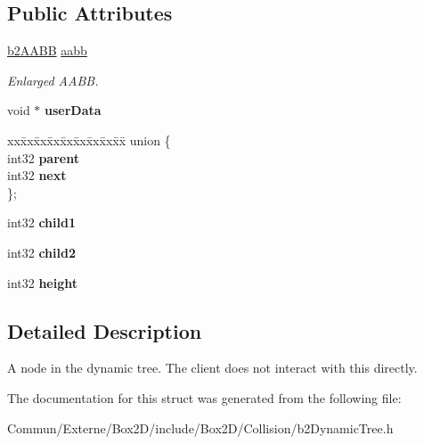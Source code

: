 \subsection*{Public Attributes}
\begin{DoxyCompactItemize}
\item 
\hyperlink{structb2_a_a_b_b}{b2\+A\+A\+BB} \hyperlink{structb2_tree_node_a798f1a594b33c713be45e76e79912239}{aabb}\hypertarget{structb2_tree_node_a798f1a594b33c713be45e76e79912239}{}\label{structb2_tree_node_a798f1a594b33c713be45e76e79912239}

\begin{DoxyCompactList}\small\item\em Enlarged A\+A\+BB. \end{DoxyCompactList}\item 
void $\ast$ {\bfseries user\+Data}\hypertarget{structb2_tree_node_aff77b3eb48326aca1b0762f5c45e56e7}{}\label{structb2_tree_node_aff77b3eb48326aca1b0762f5c45e56e7}

\item 
\begin{tabbing}
xx\=xx\=xx\=xx\=xx\=xx\=xx\=xx\=xx\=\kill
union \{\\
\>int32 {\bfseries parent}\\
\>int32 {\bfseries next}\\
\}; \hypertarget{structb2_tree_node_a9d8975d1e109fb59c7f549f1da7d75c4}{}\label{structb2_tree_node_a9d8975d1e109fb59c7f549f1da7d75c4}
\\

\end{tabbing}\item 
int32 {\bfseries child1}\hypertarget{structb2_tree_node_a3a320f2afc7d223e92ee3629602be5ca}{}\label{structb2_tree_node_a3a320f2afc7d223e92ee3629602be5ca}

\item 
int32 {\bfseries child2}\hypertarget{structb2_tree_node_aa6774ce329715b20d8b7cc8b6e3d50bc}{}\label{structb2_tree_node_aa6774ce329715b20d8b7cc8b6e3d50bc}

\item 
int32 {\bfseries height}\hypertarget{structb2_tree_node_acd183ac94a8d44195c787111be4c22e2}{}\label{structb2_tree_node_acd183ac94a8d44195c787111be4c22e2}

\end{DoxyCompactItemize}


\subsection{Detailed Description}
A node in the dynamic tree. The client does not interact with this directly. 

The documentation for this struct was generated from the following file\+:\begin{DoxyCompactItemize}
\item 
Commun/\+Externe/\+Box2\+D/include/\+Box2\+D/\+Collision/b2\+Dynamic\+Tree.\+h\end{DoxyCompactItemize}
